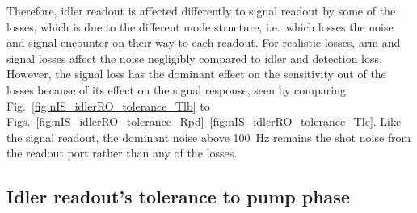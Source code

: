 Therefore, idler readout is affected differently to signal readout by some of the losses, which is due to the different mode structure, i.e.\ which losses the noise and signal encounter on their way to each readout.
For realistic losses, arm and signal losses affect the noise negligibly compared to idler and detection loss. However, the signal loss has the dominant effect on the sensitivity out of the losses because of its effect on the signal response, seen by comparing Fig.~\ref{fig:nIS_idlerRO_tolerance_Tlb} to Figs.~\ref{fig:nIS_idlerRO_tolerance_Rpd}~\ref{fig:nIS_idlerRO_tolerance_Tlc}.  Like the signal readout, the dominant noise above 100~Hz remains the shot noise from the readout port rather than any of the losses.



\subsection{Idler readout's tolerance to pump phase}


